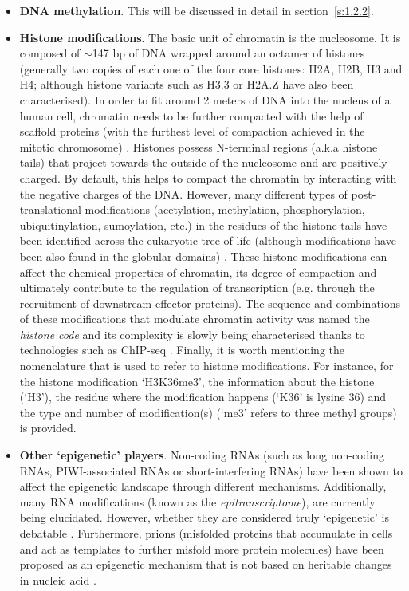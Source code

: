 \begin{itemize}
	
	\item \textbf{DNA methylation}. This will be discussed in detail in section~\ref{s:1.2.2}.
	
	\item \textbf{Histone modifications}. The basic unit of chromatin is the nucleosome. It is composed of $\sim$147 \acrshort{bp} of DNA wrapped around an octamer of histones (generally two copies of each one of the four core histones: H2A, H2B, H3 and H4; although histone variants such as H3.3 or H2A.Z have also been characterised). In order to fit around 2 meters of DNA into the nucleus of a human cell, chromatin needs to be further compacted with the help of scaffold proteins (with the furthest level of compaction achieved in the mitotic chromosome) \cite{Ou2017}. Histones possess N-terminal regions (a.k.a histone tails) that project towards the outside of the nucleosome and are positively charged. By default, this helps to compact the chromatin by interacting with the negative charges of the DNA. However, many different types of post-translational modifications (acetylation, methylation, phosphorylation, ubiquitinylation, sumoylation, etc.) in the residues of the histone tails have been identified across the eukaryotic tree of life (although modifications have been also found in the globular domains) \cite{Lawrence2016}. These histone modifications can affect the chemical properties of chromatin, its degree of compaction and ultimately contribute to the regulation of transcription (e.g. through the recruitment of downstream effector proteins). The sequence and combinations of these modifications that modulate chromatin activity was named the \textit{histone code} \cite{Strahl2000} and its complexity is slowly being characterised thanks to technologies such as \acrshort{ChIP-seq} \cite{Consortium2012, Consortium2015}. Finally, it is worth mentioning the nomenclature that is used to refer to histone modifications. For instance, for the histone modification `H3K36me3', the information about the histone (`H3'), the residue where the modification happens (`K36' is lysine 36) and the type and number of modification(s) (`me3' refers to three methyl groups) is provided.

	\item \textbf{Other `epigenetic' players}. Non-coding RNAs (such as long non-coding RNAs, PIWI-associated RNAs or short-interfering RNAs) have been shown to affect the epigenetic landscape through different mechanisms. Additionally, many RNA modifications (known as the \textit{epitranscriptome}), are currently being elucidated. However, whether they are considered truly `epigenetic' is debatable \cite{Mattick2009,Morris2014}. Furthermore, prions (misfolded proteins that accumulate in cells and act as templates to further misfold more protein molecules) have been proposed as an epigenetic mechanism that is not based on heritable changes in nucleic acid \cite{Halfmann2010}.
	
	
\end{itemize}

